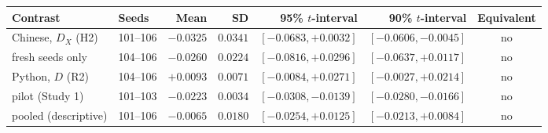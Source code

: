 \begin{tabular}{@{}llrrrrc@{}}
\toprule
Contrast & Seeds & Mean & SD & 95\% $t$-interval & 90\% $t$-interval & Equivalent \\
\midrule
Chinese, $D_X$ (H2) & 101--106 & $-0.0325$ & $0.0341$ & $[-0.0683, {+}0.0032]$ & $[-0.0606, -0.0045]$ & no \\
\quad fresh seeds only & 104--106 & $-0.0260$ & $0.0224$ & $[-0.0816, {+}0.0296]$ & $[-0.0637, {+}0.0117]$ & no \\
Python, $D$ (R2) & 104--106 & ${+}0.0093$ & $0.0071$ & $[-0.0084, {+}0.0271]$ & $[-0.0027, {+}0.0214]$ & no \\
\quad pilot (Study 1) & 101--103 & $-0.0223$ & $0.0034$ & $[-0.0308, -0.0139]$ & $[-0.0280, -0.0166]$ & no \\
\quad pooled (descriptive) & 101--106 & $-0.0065$ & $0.0180$ & $[-0.0254, {+}0.0125]$ & $[-0.0213, {+}0.0084]$ & no \\
\bottomrule
\end{tabular}
